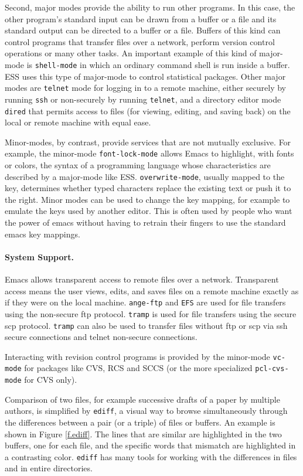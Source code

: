 \documentclass{article}
\newcommand{\stexttt}[1]{{\small\texttt{#1}}}
\newcommand{\ssf}[1]{{\small\sf{#1}}}
\begin{document}
Second, major modes provide the ability to run other programs.  In
this case, the other program's standard input can be drawn from a
buffer or a file and its standard output can be directed to a buffer
or a file.  Buffers of this kind can control programs that transfer
files over a network, perform version control operations or many other
tasks.  An important example of this kind of major-mode is
\stexttt{shell-mode} in which an ordinary command shell is run inside
a buffer.  ESS uses this type of major-mode to control statistical
packages.  Other major modes are \stexttt{telnet} mode for logging in
to a remote machine, either securely by running \stexttt{ssh} or
non-securely by running \stexttt{telnet}, and a directory editor mode
\stexttt{dired} that permits access to files (for viewing, editing,
and saving back) on the local or remote machine with equal ease.

Minor-modes, by contrast, provide services that are not mutually
exclusive.  For example, the minor-mode \stexttt{font-lock-mode}
allows Emacs to highlight, with fonts or colors, the syntax of a
programming language whose characteristics are described by a
major-mode like ESS.  \stexttt{overwrite-mode}, usually mapped to the
\ssf{Insert} key, determines whether typed characters replace the
existing text or push it to the right.  Minor modes can be used to
change the key mapping, for example to emulate the keys used by
another editor.  This is often used by people who want the power of
emacs without having to retrain their fingers to use the standard
emacs key mappings.


\paragraph{System Support.}
Emacs allows transparent access to remote files over a network.  
Transparent access means the user views, edits, and saves files on
a remote machine exactly as if they were on the local machine.
\stexttt{ange-ftp} and \stexttt{EFS} are used
for file transfers using the non-secure ftp protocol.
\stexttt{tramp} is used for file transfers using the secure scp protocol.
\stexttt{tramp} can also be used to transfer files without ftp or scp
via ssh secure connections and telnet non-secure connections.

Interacting with revision control
programs is provided by the minor-mode \stexttt{vc-mode} for packages
like CVS, RCS and SCCS (or the more
specialized \stexttt{pcl-cvs-mode} for CVS only).

Comparison of two files, for example successive drafts of a paper
by multiple authors, is simplified by \stexttt{ediff}, a visual 
way to browse simultaneously through
the differences between a pair (or a triple) of files or buffers.
An example is shown in Figure \ref{f.ediff}.  The lines that are similar
are highlighted in the two buffers, one for each file, and the specific
words that mismatch are highlighted in a contrasting color.
\stexttt{ediff} has many tools for working with the differences in
files and in entire directories.
\end{document}
